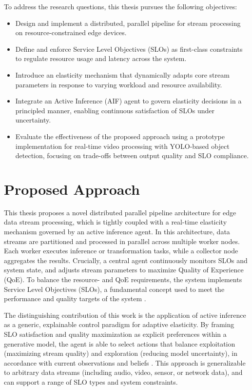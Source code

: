 To address the research questions, this thesis pursues the following objectives:

\begin{itemize}
    \item Design and implement a distributed, parallel pipeline for stream processing on resource-constrained edge devices.
    
    \item Define and enforce Service Level Objectives (SLOs) as first-class constraints to regulate resource usage and latency across the system.
    
    \item Introduce an elasticity mechanism that dynamically adapts core stream parameters in response to varying workload and resource availability.
    
    \item Integrate an Active Inference (AIF) agent to govern elasticity decisions in a principled manner, enabling continuous satisfaction of SLOs under uncertainty.
    
    \item Evaluate the effectiveness of the proposed approach using a prototype implementation for real-time video processing with YOLO-based object detection, focusing on trade-offs between output quality and SLO compliance.
\end{itemize}


\section{Proposed Approach}
This thesis proposes a novel distributed parallel pipeline architecture for edge data stream processing, which is tightly coupled with a real-time elasticity mechanism governed by an active inference agent. In this architecture, data streams are partitioned and processed in parallel across multiple worker nodes. Each worker executes inference or transformation tasks, while a collector node aggregates the results. Crucially, a central agent continuously monitors SLOs and system state, and adjusts stream parameters to maximize Quality of Experience (QoE). To balance the resource- and QoE requirements, the system implements Service Level Objectives (SLOs), a fundamental concept used to meet the performance and quality targets of the system \cite{sedlak_towards_2025, nastic_sloc_2020}.

The distinguishing contribution of this work is the application of active inference as a generic,
explainable control paradigm for adaptive elasticity. By framing SLO satisfaction and quality maximization as explicit preferences within a generative model, the agent is able to select actions that balance exploitation (maximizing stream quality) and exploration (reducing model uncertainty), in accordance with current observations and beliefs \cite{casamayor_pujol_deepslos_2024, sedlak_adaptive_2024, danilenka_adaptive_2025, lanillos_active_2021}. This approach is generalizable to arbitrary data streams (including audio, video, sensor, or network data), and can support a range of SLO types and system constraints.

